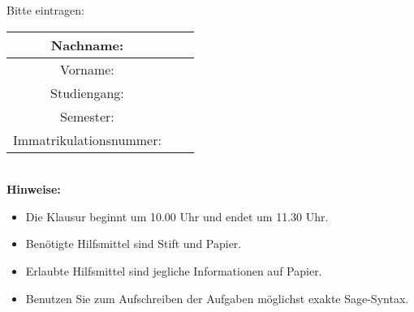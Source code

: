 \bigskip\bigskip\bigskip
Bitte eintragen:\\
\begin{center}
\begin{tabular}{|Sl|p{8cm}|}
\hline
Nachname: & \\
\hline
Vorname: & \\
\hline
Studiengang: & \\
\hline 
Semester: & \\
\hline 
Immatrikulationsnummer: & \\
\hline
\end{tabular}\\[1cm]
\textbf{Hinweise:}
\begin{itemize}
\item Die Klausur beginnt um 10.00 Uhr und endet um 11.30 Uhr.
\item Benötigte Hilfsmittel sind Stift und Papier.
\item Erlaubte Hilfsmittel sind jegliche Informationen auf Papier. 
\item Benutzen Sie zum Aufschreiben der Aufgaben möglichst exakte Sage-Syntax.
\end{itemize}
\end{center}

\newpage
\normalsize
